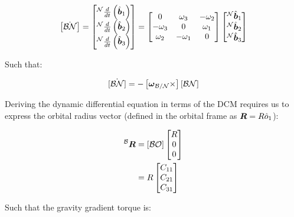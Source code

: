 \begin{align*}
    \left[\dot{\mathcal{BN}}\right] = \begin{bmatrix}
        {}^\mathcal{N}\frac{d}{dt}\left(\hat{\boldsymbol{b}}_1\right) \\ {}^\mathcal{N}\frac{d}{dt}\left(\hat{\boldsymbol{b}}_2\right) \\ {}^\mathcal{N}\frac{d}{dt}\left(\hat{\boldsymbol{b}}_3\right) \\
    \end{bmatrix} = \begin{bmatrix}
        0 & \omega_3 & -\omega_2 \\
        -\omega_3 & 0 & \omega_1 \\
        \omega_2 & -\omega_1 & 0 \\
    \end{bmatrix}
    \begin{bmatrix}
        {}^\mathcal{N}\hat{\boldsymbol{b}}_1 \\ {}^\mathcal{N}\hat{\boldsymbol{b}}_2 \\ {}^\mathcal{N}\hat{\boldsymbol{b}}_3 \\
    \end{bmatrix} \\
\end{align*}

Such that:

\begin{equation}
    \dot{\left[\mathcal{BN}\right]} = -\left[\boldsymbol{\omega}_\mathcal{B/N}\times\right] \left[\mathcal{BN}\right]
\end{equation}

Deriving the dynamic differential equation in terms of the DCM requires us to express the orbital radius vector (defined in the orbital frame as $\boldsymbol{R} = R \hat{o}_1$):

\begin{align*}
    {}^\mathcal{B}\boldsymbol{R} &= \left[\mathcal{BO}\right] \begin{bmatrix} R \\ 0 \\ 0 \end{bmatrix} \\
    &= R \begin{bmatrix} C_{11} \\ C_{21} \\ C_{31} \end{bmatrix} \\
\end{align*}

Such that the gravity gradient torque is:

